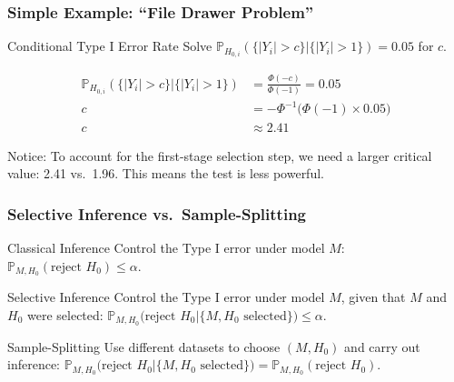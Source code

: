 \begin{frame}
  \frametitle{Simple Example: ``File Drawer Problem''}


  \begin{block}{Conditional Type I Error Rate}
  Solve $\mathbb{P}_{H_{0,i}}\left( \{|Y_i| > c\} | \{|Y_i|>1\}\right) = 0.05$ for $c$.
\end{block}

  \begin{align*}
    \mathbb{P}_{H_{0,i}}\left( \{|Y_i| > c\} | \{|Y_i|>1\}\right) &= \frac{\Phi(-c)}{\Phi(-1)} = 0.05\\
    c &= -\Phi^{-1}\big(\Phi(-1) \times 0.05\big)\\
    c &\approx 2.41 
  \end{align*}

  \vspace{-2em}

  \begin{alertblock}{Notice:}
  To account for the first-stage selection step, we need a larger critical value: 2.41 vs.\ 1.96. This means the test is less powerful.
\end{alertblock}


\end{frame}
\begin{frame}
  \frametitle{Selective Inference vs.\ Sample-Splitting}

  \begin{block}{Classical Inference}
    Control the Type I error under model $M$: $\mathbb{P}_{M,H_0}(\mbox{reject } H_0) \leq \alpha$.
  \end{block}

  \begin{block}{Selective Inference}
    Control the Type I error under model $M$, \alert{given} that $M$ and $H_0$ were selected: $\mathbb{P}_{M,H_0}\big(\mbox{reject } H_0|\{M,H_0 \mbox{ selected}\}\big) \leq \alpha$.
  \end{block}

  \begin{block}{Sample-Splitting}
    Use different datasets to choose $(M, H_0)$ and carry out inference: $\mathbb{P}_{M,H_0}\big(\mbox{reject } H_0|\{M,H_0 \mbox{ selected}\}\big) = \mathbb{P}_{M,H_0}(\mbox{reject }H_0)$.
  \end{block}


\end{frame}
